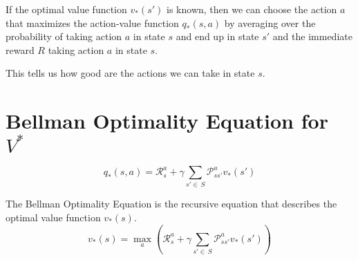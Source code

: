 \begin{center}
\end{center}

If the optimal value function $v_*(s')$ is known, then we can choose the
action $a$ that maximizes the action-value function $q_*(s,a)$ by
averaging over the probability of taking action $a$ in state $s$ and end
up in state $s'$ and the immediate reward $R$ taking action $a$ in state
$s$.

This tells us how good are the actions we can take in state $s$.


\section{Bellman Optimality Equation for $V^*$}\label{sec:bellman-optimality-equation-for-v}
\[
    q_*(s,a) = \mathcal{R}_{s}^{a} + \gamma\sum_{s'\in\,S}\mathcal{P}_{ss'}^{a}v_*(s')
\]

\begin{definition}
    The Bellman Optimality Equation is the recursive equation that describes the optimal value function $v_*(s)$.
    \[
        v_*(s) = \max_{a}\left(\mathcal{R}_{s}^{a} + \gamma\sum_{s'\in\,S}\mathcal{P}_{ss'}^{a}v_*(s')\right)
    \]
\end{definition}


